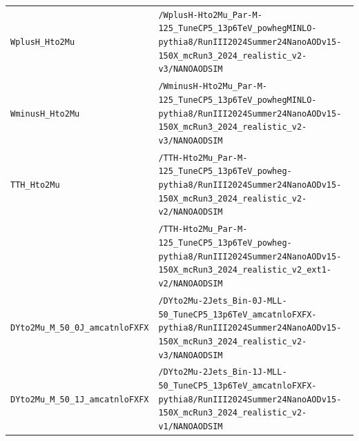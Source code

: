 \begin{longtable}{@{}>{\RaggedRight\arraybackslash}p{} >{\RaggedRight\arraybackslash}p{}@{}}
\addlinespace[2pt]
\texttt{WplusH\_\allowbreak{}Hto2Mu} & \texttt{/\allowbreak{}WplusH-\allowbreak{}Hto2Mu\_\allowbreak{}Par-\allowbreak{}M-\allowbreak{}125\_\allowbreak{}TuneCP5\_\allowbreak{}13p6TeV\_\allowbreak{}powhegMINLO-\allowbreak{}pythia8/\allowbreak{}RunIII2024Summer24NanoAODv15-\allowbreak{}150X\_\allowbreak{}mcRun3\_\allowbreak{}2024\_\allowbreak{}realistic\_\allowbreak{}v2-\allowbreak{}v3/\allowbreak{}NANOAODSIM} \\
\addlinespace[2pt]
\texttt{WminusH\_\allowbreak{}Hto2Mu} & \texttt{/\allowbreak{}WminusH-\allowbreak{}Hto2Mu\_\allowbreak{}Par-\allowbreak{}M-\allowbreak{}125\_\allowbreak{}TuneCP5\_\allowbreak{}13p6TeV\_\allowbreak{}powhegMINLO-\allowbreak{}pythia8/\allowbreak{}RunIII2024Summer24NanoAODv15-\allowbreak{}150X\_\allowbreak{}mcRun3\_\allowbreak{}2024\_\allowbreak{}realistic\_\allowbreak{}v2-\allowbreak{}v3/\allowbreak{}NANOAODSIM} \\
\addlinespace[2pt]
\texttt{TTH\_\allowbreak{}Hto2Mu} & \texttt{/\allowbreak{}TTH-\allowbreak{}Hto2Mu\_\allowbreak{}Par-\allowbreak{}M-\allowbreak{}125\_\allowbreak{}TuneCP5\_\allowbreak{}13p6TeV\_\allowbreak{}powheg-\allowbreak{}pythia8/\allowbreak{}RunIII2024Summer24NanoAODv15-\allowbreak{}150X\_\allowbreak{}mcRun3\_\allowbreak{}2024\_\allowbreak{}realistic\_\allowbreak{}v2-\allowbreak{}v2/\allowbreak{}NANOAODSIM} \\
 & \texttt{/\allowbreak{}TTH-\allowbreak{}Hto2Mu\_\allowbreak{}Par-\allowbreak{}M-\allowbreak{}125\_\allowbreak{}TuneCP5\_\allowbreak{}13p6TeV\_\allowbreak{}powheg-\allowbreak{}pythia8/\allowbreak{}RunIII2024Summer24NanoAODv15-\allowbreak{}150X\_\allowbreak{}mcRun3\_\allowbreak{}2024\_\allowbreak{}realistic\_\allowbreak{}v2\_\allowbreak{}ext1-\allowbreak{}v2/\allowbreak{}NANOAODSIM} \\
\addlinespace[2pt]
\texttt{DYto2Mu\_\allowbreak{}M\_\allowbreak{}50\_\allowbreak{}0J\_\allowbreak{}amcatnloFXFX} & \texttt{/\allowbreak{}DYto2Mu-\allowbreak{}2Jets\_\allowbreak{}Bin-\allowbreak{}0J-\allowbreak{}MLL-\allowbreak{}50\_\allowbreak{}TuneCP5\_\allowbreak{}13p6TeV\_\allowbreak{}amcatnloFXFX-\allowbreak{}pythia8/\allowbreak{}RunIII2024Summer24NanoAODv15-\allowbreak{}150X\_\allowbreak{}mcRun3\_\allowbreak{}2024\_\allowbreak{}realistic\_\allowbreak{}v2-\allowbreak{}v3/\allowbreak{}NANOAODSIM} \\
\addlinespace[2pt]
\texttt{DYto2Mu\_\allowbreak{}M\_\allowbreak{}50\_\allowbreak{}1J\_\allowbreak{}amcatnloFXFX} & \texttt{/\allowbreak{}DYto2Mu-\allowbreak{}2Jets\_\allowbreak{}Bin-\allowbreak{}1J-\allowbreak{}MLL-\allowbreak{}50\_\allowbreak{}TuneCP5\_\allowbreak{}13p6TeV\_\allowbreak{}amcatnloFXFX-\allowbreak{}pythia8/\allowbreak{}RunIII2024Summer24NanoAODv15-\allowbreak{}150X\_\allowbreak{}mcRun3\_\allowbreak{}2024\_\allowbreak{}realistic\_\allowbreak{}v2-\allowbreak{}v1/\allowbreak{}NANOAODSIM} \\

\end{longtable}
